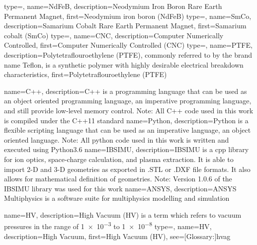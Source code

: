 {
    type=\acronymtype,
    name={NdFeB},
    description={Neodymium Iron Boron Rare Earth Permanent Magnet},
    first={Neodymium iron boron (NdFeB)}
}
{
    type=\acronymtype,
    name={SmCo},
    description={Samarium Cobalt Rare Earth Permanent Magnet},
    first={Samarium cobalt (SmCo)}
}
{
    type=\acronymtype,
    name={CNC},
    description={Computer Numerically Controlled},
    first={Computer Numerically Controlled (CNC)}
}
{
    type=\acronymtype,
    name={PTFE},
    description={Polytetraflouroethylene (PTFE), commonly referred to by the brand name Teflon, is a synthetic polymer with highly desirable electrical breakdown characteristics},
    first={Polytetraflouroethylene (PTFE)}
}

{%
    name={C++},
    description={C++ is a programming language that can be used as an object oriented programming language, an imperative programming language, and still provide low-level memory control. Note: All C++ code used in this work is compiled under the C++11 standard}
}
{%
    name={Python},
    description={Python is a flexible scripting language that can be used as an imperative language, an object oriented language. Note: All python code used in this work is written and executed using Python3.6}
}
{%
    name={IBSIMU},
    description={IBSIMU is a \gls{cpp} library for ion optics, space-charge calculation, and plasma extraction. It is able to import 2-D and 3-D geometries as exported in .STL or .DXF file formats. It also allows for mathematical definition of geometries. Note: Version 1.0.6 of the IBSIMU library was used for this work \cite{acc:14}}
}
{
    name={ANSYS},
    description={ANSYS Multiphysics is a software suite for multiphysics modelling and simulation}
}

{%
 name={HV},
 description={High Vacuum (HV) is a term which refers to vacuum pressures in the range of \SI{1e-3}{\torr} to \SI{1e-8}{\torr}\cite{acc:13}}
}
{%
 type=\acronymtype,
 name={HV},
 description={High Vacuum},
 first={High Vacuum (HV)},
 see=[Glossary:]{hvag}
}
